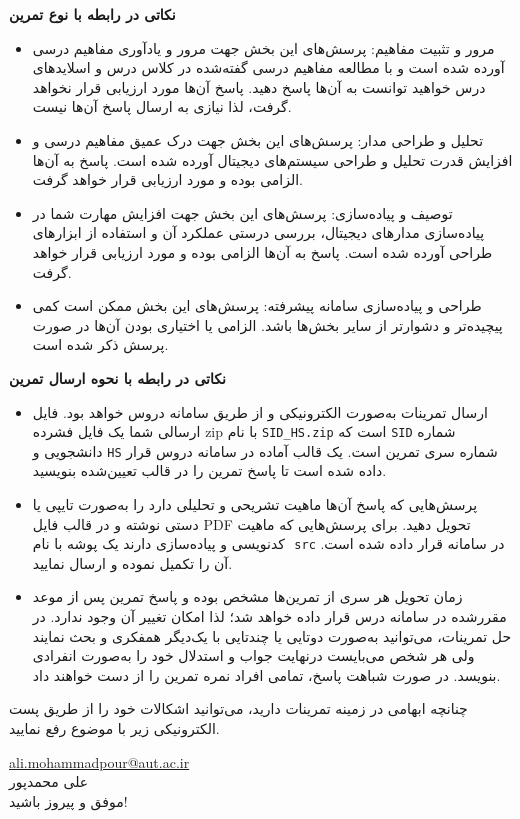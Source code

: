 \newpage
\FirstPageStyle

{
	\begin{center}
		\bfseries 
نکاتی در رابطه با نوع تمرین
	\end{center}
	\begin{itemize}[noitemsep]
		\setlength\itemsep{0em}
		\item 	مرور و تثبیت مفاهیم: پرسش‌های این بخش جهت مرور و یادآوری مفاهیم درسی آورده شده است و با مطالعه مفاهیم درسی گفته‌شده در کلاس درس و اسلایدهای درس خواهید توانست به آن‌ها پاسخ دهید. پاسخ آن‌ها مورد ارزیابی قرار نخواهد گرفت، لذا نیازی به ارسال پاسخ آن‌ها نیست. 
		\item 
تحلیل و طراحی مدار: پرسش‌های این بخش جهت درک عمیق مفاهیم درسی و افزایش قدرت تحلیل و طراحی سیستم‌های دیجیتال آورده شده است. پاسخ به آن‌ها الزامی بوده و مورد ارزیابی قرار خواهد گرفت.
		\item 
		توصیف و پیاده‌سازی: پرسش‌های این بخش جهت افزایش مهارت شما در پیاده‌سازی مدارهای دیجیتال، بررسی درستی عملکرد آن و استفاده از ابزارهای طراحی آورده شده است. پاسخ به آن‌ها الزامی بوده و مورد ارزیابی قرار خواهد گرفت.
		
		\item طراحی و پیاده‌سازی سامانه پیشرفته: پرسش‌های این بخش ممکن است کمی پیچیده‌تر و دشوارتر از سایر بخش‌ها باشد. الزامی یا اختیاری بودن آن‌ها در صورت پرسش ذکر شده است. 
	\end{itemize}
\begin{center}
\bfseries 
نکاتی در رابطه با نحوه ارسال تمرین
\end{center}
\begin{itemize}[noitemsep]
		\setlength\itemsep{0em}
		\item
ارسال تمرینات به‌صورت الکترونیکی و از طریق سامانه دروس  خواهد بود. فایل ارسالی شما یک فایل فشرده zip  با نام \verb;SID_HS.zip; است که \verb;SID; شماره دانشجویی و \verb;HS; شماره سری  تمرین است. یک قالب آماده در سامانه دروس قرار داده شده است تا پاسخ تمرین را در قالب تعیین‌شده بنویسید.
		\item
پرسش‌هایی که پاسخ آن‌ها ماهیت تشریحی و تحلیلی دارد را به‌صورت  تایپی یا دستی نوشته و در قالب فایل PDF تحویل دهید. برای پرسش‌هایی که ماهیت کدنویسی و پیاده‌سازی دارند یک پوشه با نام ‌ \verb;src; در سامانه قرار داده شده است. آن را تکمیل نموده و ارسال نمایید.	
\item 
زمان تحویل هر سری از تمرین‌ها مشخص بوده و پاسخ تمرین پس از موعد مقررشده در سامانه درس قرار داده خواهد شد؛ لذا امکان تغییر آن وجود ندارد. در حل تمرینات، می‌توانید به‌صورت دوتایی یا چندتایی با یک‌دیگر همفکری و بحث نمایند ولی هر شخص می‌بایست درنهایت جواب و استدلال خود را به‌صورت انفرادی بنویسد. در صورت شباهت پاسخ، تمامی افراد نمره تمرین را از دست خواهند داد.
\end{itemize}
چنانچه ابهامی در زمینه تمرینات دارید، می‌توانید اشکالات خود را از طریق پست الکترونیکی زیر با موضوع
\textbf{}
رفع نمایید.
\begin{flushleft}
\href{mailto:ali.mohammadpour@aut.ac.ir}{ali.mohammadpour@aut.ac.ir}\\
علی محمدپور\\
موفق و پیروز باشید!
\end{flushleft}
}
